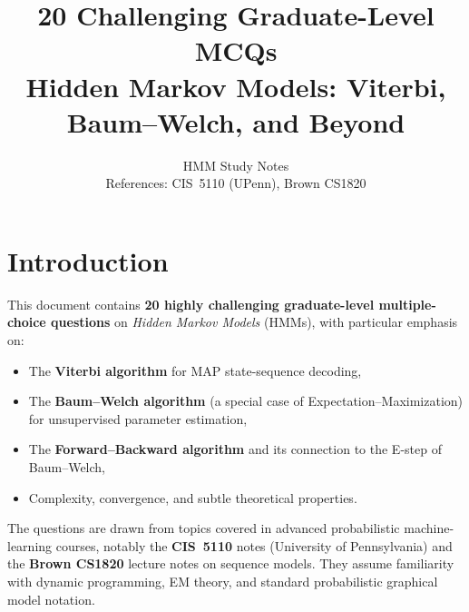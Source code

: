 \documentclass[12pt]{article}
\title{\textbf{20 Challenging Graduate-Level MCQs}\\
       \large Hidden Markov Models: Viterbi, Baum--Welch, and Beyond}
\author{HMM Study Notes\\
        \small References: CIS~5110 (UPenn), Brown CS1820}
\date{}
\begin{document}
\maketitle
\tableofcontents
\newpage

\section{Introduction}

This document contains \textbf{20 highly challenging graduate-level multiple-choice
questions} on \emph{Hidden Markov Models} (HMMs), with particular emphasis on:

\begin{itemize}
    \item The \textbf{Viterbi algorithm} for MAP state-sequence decoding,
    \item The \textbf{Baum--Welch algorithm} (a special case of Expectation--Maximization)
          for unsupervised parameter estimation,
    \item The \textbf{Forward--Backward algorithm} and its connection to the E-step of
          Baum--Welch,
    \item Complexity, convergence, and subtle theoretical properties.
\end{itemize}

The questions are drawn from topics covered in advanced probabilistic machine-learning
courses, notably the \textbf{CIS~5110} notes (University of Pennsylvania) and the
\textbf{Brown CS1820} lecture notes on sequence models.  They assume familiarity with
dynamic programming, EM theory, and standard probabilistic graphical model notation.
\end{document}
